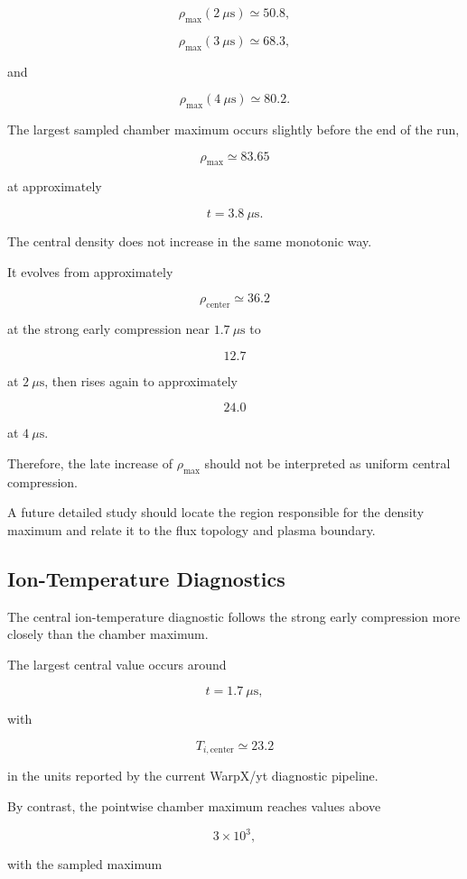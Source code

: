 \documentclass[11pt,a4paper]{article}
\begin{document}
\[
\rho_{\max}(2~\mu\mathrm{s})
\simeq 50.8,
\]

\[
\rho_{\max}(3~\mu\mathrm{s})
\simeq 68.3,
\]

and

\[
\rho_{\max}(4~\mu\mathrm{s})
\simeq 80.2.
\]

The largest sampled chamber maximum occurs slightly before the end of the run,

\[
\rho_{\max}
\simeq
83.65
\]

at approximately

\[
t=3.8~\mu\mathrm{s}.
\]

The central density does not increase in the same monotonic way.

It evolves from approximately

\[
\rho_{\mathrm{center}}
\simeq 36.2
\]

at the strong early compression near \(1.7~\mu\mathrm{s}\) to

\[
12.7
\]

at \(2~\mu\mathrm{s}\), then rises again to approximately

\[
24.0
\]

at \(4~\mu\mathrm{s}\).

Therefore, the late increase of \(\rho_{\max}\) should not be interpreted as
uniform central compression.

A future detailed study should locate the region responsible for the density
maximum and relate it to the flux topology and plasma boundary.

\subsection{Ion-Temperature Diagnostics}

The central ion-temperature diagnostic follows the strong early compression
more closely than the chamber maximum.

The largest central value occurs around

\[
t=1.7~\mu\mathrm{s},
\]

with

\[
T_{i,\mathrm{center}}
\simeq 23.2
\]

in the units reported by the current WarpX/yt diagnostic pipeline.

By contrast, the pointwise chamber maximum reaches values above

\[
3\times10^3,
\]

with the sampled maximum
\end{document}

